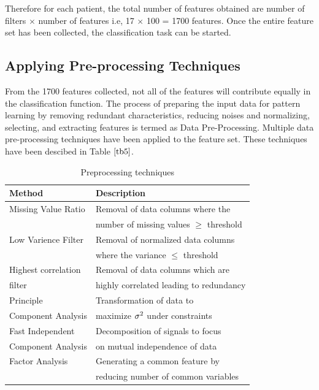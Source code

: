 \documentclass[10pt,journal,compsoc]{IEEEtran}
\begin{document}
Therefore for each patient, the total number of features obtained are number of filters $\times$ number of features i.e, 17 $\times$ 100 = 1700 features. Once the entire feature set has been collected, the classification task can be started. 

\subsection{Applying Pre-processing Techniques}

From the 1700 features collected, not all of the features will contribute equally in the classification function. The process of preparing the input data for pattern learning by removing redundant characteristics, reducing noises and normalizing, selecting, and extracting features is termed as Data Pre-Processing. Multiple data pre-processing techniques have been applied to the feature set. These techniques have been descibed in Table $\ref{tb5}$.

\begin{table}[!b]
\centering
\caption{Preprocessing techniques}
\label{tb5}
\begin{tabular}{| l | l |}
\hline
\textbf{Method} & \textbf{Description}\\
\hline
Missing Value Ratio & Removal of data columns where the  \\
&number of missing values $\geq$ threshold\\
\hline
Low Varience Filter & Removal of normalized data columns \\
&where the variance $\leq$ threshold\\
\hline
Highest correlation  & Removal of data columns which are \\
filter&highly correlated leading to redundancy\\
\hline
Principle & Transformation of data to\\
Component Analysis &maximize $\sigma\textsuperscript{2}$ under constraints\\
\hline
Fast Independent & Decomposition of signals to focus  \\
Component Analysis &on mutual independence of data\\
\hline
Factor Analysis & Generating a common feature by \\
&reducing number of common variables \\
\hline
\end{tabular}
\end{table}
\end{document}
